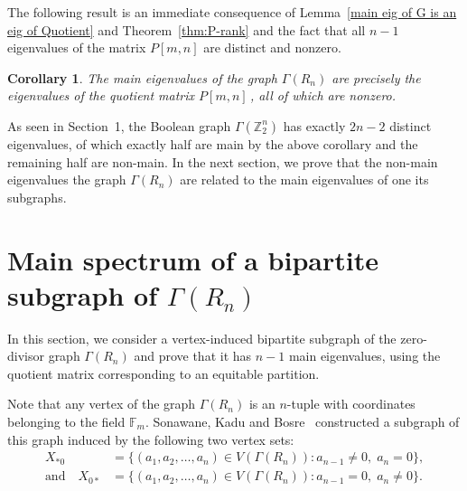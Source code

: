 \documentclass[11pt,oneside]{article}
\theoremstyle{plain}
\theoremstyle{plain}
\newtheorem{corollary}[theorem]{Corollary}
\theoremstyle{definition}
\numberwithin{figure}{section}
\theoremstyle{remark}
\numberwithin{equation}{section}
\begin{document}
		
		The following result is an immediate consequence of  Lemma~\ref{main eig of G is an eig of Quotient} and Theorem~\ref{thm:P-rank} and the fact that all $n-1$ eigenvalues of the matrix $P[m,n]$ are distinct and nonzero\cite{sonawane2}. 
		\begin{corollary}\label{cor:main eigenvalues of ZDG are eigenvalue of P}
			The main eigenvalues of the graph $\Gamma(R_n)$ are precisely the eigenvalues of the quotient matrix $P[m,n]$\,, all of which are nonzero.
		\end{corollary}
		As seen in Section~1, the Boolean graph $\Gamma(\mathbb{Z}_2^n)$ has exactly $2n-2$ distinct eigenvalues, of which exactly half are main by the above corollary and the remaining half are non-main. In the next section, we prove that the non-main eigenvalues the graph $\Gamma(R_n)$ are related to the main eigenvalues of  one its subgraphs. 
		
		\section{Main spectrum of a bipartite subgraph of
			\texorpdfstring{$\Gamma(R_n)$}{Gamma(Rn)}}
		\noindent
		In this section, we consider a vertex-induced bipartite subgraph of the zero-divisor graph $ \Gamma(R_n)$ and prove that it has $n-1$ main eigenvalues, using the quotient matrix corresponding to an equitable partition. 
		
		Note that any vertex of the graph $\Gamma(R_n)$ is an $n$-tuple with coordinates belonging to the field $\mathbb{F}_m.$ Sonawane, Kadu and Bosre~\cite{sonawane1} constructed a subgraph of this graph induced by the following two vertex sets: 
		\[
		\begin{aligned}
			X_{*0} &= \{(a_1, a_2, \dots, a_n) \in V(\Gamma(R_n)) \colon a_{n-1} \neq 0,\; a_n = 0\}, \\ \text{and} \quad
			X_{0*} &= \{(a_1, a_2, \dots, a_n) \in V(\Gamma(R_n)) \colon a_{n-1} = 0,\; a_n \neq 0\}.
		\end{aligned}
		\]
		
		
\end{document}

